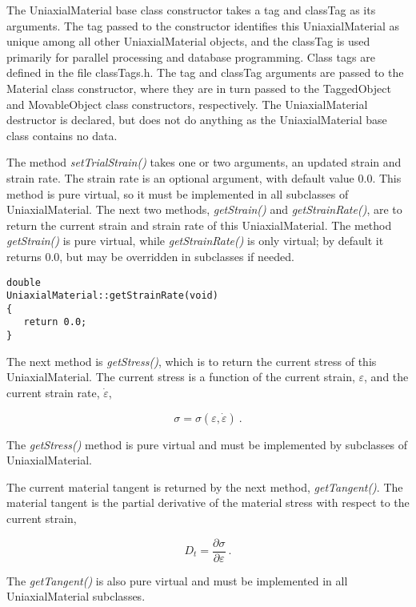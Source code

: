 \documentclass[12pt]{article}
\begin{document}
The UniaxialMaterial base class
constructor takes a tag and classTag as its arguments.
The tag passed to the constructor identifies this UniaxialMaterial
as unique among all other UniaxialMaterial objects, and the classTag is used primarily for
parallel processing and database programming. Class tags are defined in the file classTags.h.
The tag and classTag arguments are passed to the Material class constructor, where they
are in turn passed to the TaggedObject and MovableObject class constructors, respectively.
The UniaxialMaterial destructor is declared, but does not do anything as the UniaxialMaterial
base class contains no data.

The method {\em setTrialStrain()} takes one or two arguments, an updated strain
and strain rate. The strain rate is an optional argument, with default value $0.0$. This
method is pure virtual, so it must be implemented in all
subclasses of UniaxialMaterial.
The next two methods, {\em getStrain()} and {\em getStrainRate()}, are to return the current
strain and strain rate of this UniaxialMaterial. The method {\em getStrain()} is pure
virtual, while {\em getStrainRate()} is only virtual; by default it returns $0.0$, but
may be overridden in subclasses if needed.

{\sf\small
\begin{verbatim}
double
UniaxialMaterial::getStrainRate(void)
{
   return 0.0;
}
\end{verbatim}
}

The next method is {\em getStress()}, which is to return the current stress of this
UniaxialMaterial. The current stress is a function of the current strain, $\varepsilon$, and
the current strain rate, $\dot{\varepsilon}$,

\begin{equation}
 \sigma = \sigma(\varepsilon,\dot{\varepsilon}) \: .
\end{equation}

\noindent The {\em getStress()} method is pure virtual and must be implemented by subclasses
of UniaxialMaterial.

The current material tangent is returned by the next method, {\em getTangent()}. The
material tangent is the partial derivative of the material stress with respect to the
current strain,

\begin{equation}
 D_t = \frac{\partial{\sigma}}{\partial{\varepsilon}} \: .
\end{equation}

\noindent The {\em getTangent()} is also pure virtual and must be implemented in all UniaxialMaterial
subclasses.
\end{document}
